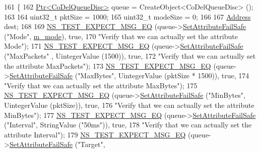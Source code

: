 \begin{DoxyCode}
161 \{
162   \hyperlink{classns3_1_1Ptr}{Ptr<CoDelQueueDisc>} queue = CreateObject<CoDelQueueDisc> ();
163 
164   uint32\_t pktSize = 1000;
165   uint32\_t modeSize = 0;
166   
167   \hyperlink{classns3_1_1Address}{Address} dest;
168 
169   \hyperlink{group__testing_ga7304ba46a28d8cf08dfdfd6499cf7068}{NS\_TEST\_EXPECT\_MSG\_EQ} (queue->\hyperlink{classns3_1_1ObjectBase_aa7d333004e970f925a4ed5df275541b5}{SetAttributeFailSafe} (\textcolor{stringliteral}{"Mode"}, 
      \hyperlink{classCoDelQueueDiscBasicEnqueueDequeue_a8fbc5f104a809347a06d9103b996170d}{m\_mode}), \textcolor{keyword}{true},
170                          \textcolor{stringliteral}{"Verify that we can actually set the attribute Mode"});
171   \hyperlink{group__testing_ga7304ba46a28d8cf08dfdfd6499cf7068}{NS\_TEST\_EXPECT\_MSG\_EQ} (queue->\hyperlink{classns3_1_1ObjectBase_aa7d333004e970f925a4ed5df275541b5}{SetAttributeFailSafe} (\textcolor{stringliteral}{"MaxPackets"}
      , UintegerValue (1500)), \textcolor{keyword}{true},
172                          \textcolor{stringliteral}{"Verify that we can actually set the attribute MaxPackets"});
173   \hyperlink{group__testing_ga7304ba46a28d8cf08dfdfd6499cf7068}{NS\_TEST\_EXPECT\_MSG\_EQ} (queue->\hyperlink{classns3_1_1ObjectBase_aa7d333004e970f925a4ed5df275541b5}{SetAttributeFailSafe} (\textcolor{stringliteral}{"MaxBytes"}, 
      UintegerValue (pktSize * 1500)), \textcolor{keyword}{true},
174                          \textcolor{stringliteral}{"Verify that we can actually set the attribute MaxBytes"});
175   \hyperlink{group__testing_ga7304ba46a28d8cf08dfdfd6499cf7068}{NS\_TEST\_EXPECT\_MSG\_EQ} (queue->\hyperlink{classns3_1_1ObjectBase_aa7d333004e970f925a4ed5df275541b5}{SetAttributeFailSafe} (\textcolor{stringliteral}{"MinBytes"}, 
      UintegerValue (pktSize)), \textcolor{keyword}{true},
176                          \textcolor{stringliteral}{"Verify that we can actually set the attribute MinBytes"});
177   \hyperlink{group__testing_ga7304ba46a28d8cf08dfdfd6499cf7068}{NS\_TEST\_EXPECT\_MSG\_EQ} (queue->\hyperlink{classns3_1_1ObjectBase_aa7d333004e970f925a4ed5df275541b5}{SetAttributeFailSafe} (\textcolor{stringliteral}{"Interval"}, 
      StringValue (\textcolor{stringliteral}{"50ms"})), \textcolor{keyword}{true},
178                          \textcolor{stringliteral}{"Verify that we can actually set the attribute Interval"});
179   \hyperlink{group__testing_ga7304ba46a28d8cf08dfdfd6499cf7068}{NS\_TEST\_EXPECT\_MSG\_EQ} (queue->\hyperlink{classns3_1_1ObjectBase_aa7d333004e970f925a4ed5df275541b5}{SetAttributeFailSafe} (\textcolor{stringliteral}{"Target"}, 

\end{DoxyCode}
